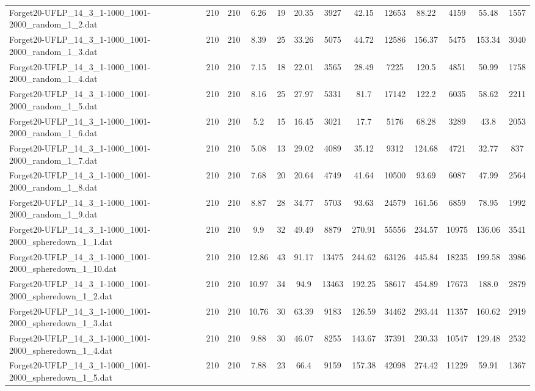 \begin{table}[!ht]
{\begin{tabular}{lcccccccccccc}
Forget20-UFLP\_14\_3\_1-1000\_1001-2000\_random\_1\_2.dat & 210 & 210 & 6.26 & 19 & 20.35 & 3927 & 42.15 & 12653 & 88.22 & 4159 & 55.48 & 1557 \\
Forget20-UFLP\_14\_3\_1-1000\_1001-2000\_random\_1\_3.dat & 210 & 210 & 8.39 & 25 & 33.26 & 5075 & 44.72 & 12586 & 156.37 & 5475 & 153.34 & 3040 \\
Forget20-UFLP\_14\_3\_1-1000\_1001-2000\_random\_1\_4.dat & 210 & 210 & 7.15 & 18 & 22.01 & 3565 & 28.49 & 7225 & 120.5 & 4851 & 50.99 & 1758 \\
Forget20-UFLP\_14\_3\_1-1000\_1001-2000\_random\_1\_5.dat & 210 & 210 & 8.16 & 25 & 27.97 & 5331 & 81.7 & 17142 & 122.2 & 6035 & 58.62 & 2211 \\
Forget20-UFLP\_14\_3\_1-1000\_1001-2000\_random\_1\_6.dat & 210 & 210 & 5.2 & 15 & 16.45 & 3021 & 17.7 & 5176 & 68.28 & 3289 & 43.8 & 2053 \\
Forget20-UFLP\_14\_3\_1-1000\_1001-2000\_random\_1\_7.dat & 210 & 210 & 5.08 & 13 & 29.02 & 4089 & 35.12 & 9312 & 124.68 & 4721 & 32.77 & 837 \\
Forget20-UFLP\_14\_3\_1-1000\_1001-2000\_random\_1\_8.dat & 210 & 210 & 7.68 & 20 & 20.64 & 4749 & 41.64 & 10500 & 93.69 & 6087 & 47.99 & 2564 \\
Forget20-UFLP\_14\_3\_1-1000\_1001-2000\_random\_1\_9.dat & 210 & 210 & 8.87 & 28 & 34.77 & 5703 & 93.63 & 24579 & 161.56 & 6859 & 78.95 & 1992 \\
Forget20-UFLP\_14\_3\_1-1000\_1001-2000\_spheredown\_1\_1.dat & 210 & 210 & 9.9 & 32 & 49.49 & 8879 & 270.91 & 55556 & 234.57 & 10975 & 136.06 & 3541 \\
Forget20-UFLP\_14\_3\_1-1000\_1001-2000\_spheredown\_1\_10.dat & 210 & 210 & 12.86 & 43 & 91.17 & 13475 & 244.62 & 63126 & 445.84 & 18235 & 199.58 & 3986 \\
Forget20-UFLP\_14\_3\_1-1000\_1001-2000\_spheredown\_1\_2.dat & 210 & 210 & 10.97 & 34 & 94.9 & 13463 & 192.25 & 58617 & 454.89 & 17673 & 188.0 & 2879 \\
Forget20-UFLP\_14\_3\_1-1000\_1001-2000\_spheredown\_1\_3.dat & 210 & 210 & 10.76 & 30 & 63.39 & 9183 & 126.59 & 34462 & 293.44 & 11357 & 160.62 & 2919 \\
Forget20-UFLP\_14\_3\_1-1000\_1001-2000\_spheredown\_1\_4.dat & 210 & 210 & 9.88 & 30 & 46.07 & 8255 & 143.67 & 37391 & 230.33 & 10547 & 129.48 & 2532 \\
Forget20-UFLP\_14\_3\_1-1000\_1001-2000\_spheredown\_1\_5.dat & 210 & 210 & 7.88 & 23 & 66.4 & 9159 & 157.38 & 42098 & 274.42 & 11229 & 59.91 & 1367 \\

\end{tabular}}
\end{table}
